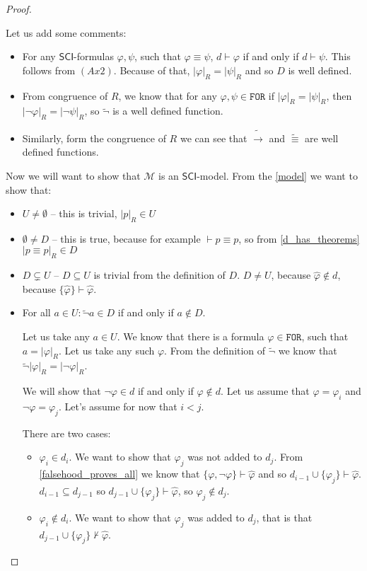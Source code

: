 \documentclass{article}
\theoremstyle{definition}
\theoremstyle{definition}
\theoremstyle{definition}
\newcommand*{\id}{\equiv}
\newcommand*{\ra}{\rightarrow}
\newcommand*{\FOR}{\texttt{FOR}}
\newcommand{\SCI}{$\mathsf{SCI}$\xspace}
\begin{document}
\begin{proof}
\begin{itemize}
    \end{itemize}
    Let us add some comments:
    \begin{itemize}
        \item For any \SCI-formulas $\varphi, \psi$, such that $\varphi \id \psi$, $d \vdash
                  \varphi$ if and only if $d \vdash \psi$. This follows from $(Ax2)$. Because of
              that, $|\varphi|_R = |\psi|_R$ and so $D$ is well defined.
        \item From congruence of $R$, we know that for any $\varphi, \psi \in \FOR$ if
              $|\varphi|_R = |\psi|_R$, then $|\lnot \varphi|_R = |\lnot \psi|_R$, so
              $\tilde{\lnot}$ is a well defined function.
        \item Similarly, form the congruence of $R$ we can see that $\tilde{\ra}$ and
              $\tilde{\id}$ are well defined functions.
    \end{itemize}
    Now we will want to show that $\mathcal{M}$ is an \SCI-model. From the
    \cref{model} we want to show that:
    \begin{itemize}
        \item $U \not = \emptyset$ -- this is trivial, $|p|_R \in U$
        \item $\emptyset \not = D$ -- this is true, because for example $\vdash p \id p$, so from \cref{d_has_theorems} $|p \id p|_R \in D$
        \item $D \subsetneq U$ --  $D \subseteq U$ is trivial from the definition of $D$. $D \not = U$, because $\hat{\varphi} \not \in d$, because $\{\hat{\varphi}\} \vdash \hat{\varphi}$.
        \item For all $a \in U: \tilde{\lnot} a \in D$ if and only if $a \not \in D$.

              Let us take any $a \in U$. We know that there is a formula $\varphi \in \FOR$,
              such that $a = |\varphi|_R$. Let us take any such $\varphi$. From the
              definition of $\tilde{\lnot}$ we know that $\tilde{\lnot}|\varphi|_R = |\lnot
                  \varphi|_R$.

              We will show that $\lnot \varphi \in d$ if and only if $\varphi \not \in d$.
              Let us assume that $\varphi = \varphi_i$ and $\lnot \varphi = \varphi_j$. Let's
              assume for now that $i < j$.

              There are two cases:
              \begin{itemize}
                  \item $\varphi_i \in d_i$. We want to show that $\varphi_j$ was not added to $d_j$. From \cref{falsehood_proves_all} we know that $\{\varphi, \lnot \varphi\} \vdash \hat{\varphi}$ and so $d_{i-1} \cup \{\varphi_j\} \vdash \hat{\varphi}$. $d_{i-1} \subseteq d_{j-1}$ so $d_{j-1} \cup \{\varphi_j\} \vdash \hat{\varphi}$, so $\varphi_j \not \in d_j$.
                  \item $\varphi_i \not \in d_i$. We want to show that $\varphi_j$ was added to $d_j$, that is that $d_{j-1} \cup \{\varphi_j\} \not \vdash \hat{\varphi}$.


\end{itemize}
\end{itemize}
\end{proof}
\end{document}
